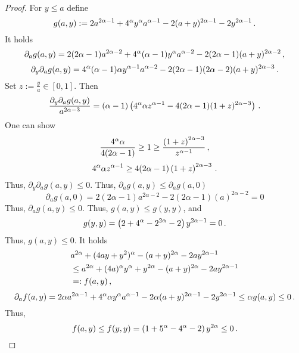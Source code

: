 \begin{proof}
	For $y\leq a$ define
	\begin{equation*}
		g(a,y) := 2a^{2\alpha-1} + 4^\alpha y^\alpha a^{\alpha-1} - 2(a+y)^{2\alpha-1} - 2y^{2\alpha-1}
		\, .
	\end{equation*}
	It holds
	\begin{equation*}
		\partial_a g(a,y) = 2(2\alpha-1)a^{2\alpha-2} + 4^\alpha(\alpha-1) y^\alpha a^{\alpha-2} - 2(2\alpha-1)(a+y)^{2\alpha-2}
		\, ,
	\end{equation*}
	\begin{equation*}
		\partial_y \partial_a g(a,y) = 4^\alpha (\alpha-1) \alpha y^{\alpha-1} a^{\alpha-2} - 2(2\alpha-1)(2\alpha-2)(a+y)^{2\alpha-3}
		\, .
	\end{equation*}
	Set $z := \frac{y}{a} \in[0,1]$. Then
	\begin{equation*}
	 \frac{\partial_y \partial_a g(a,y)}{a^{2\alpha-3}} =  (\alpha-1) \left( 4^\alpha \alpha z^{\alpha-1} - 4(2\alpha-1)(1+z)^{2\alpha-3} \right)
	 \, .
	\end{equation*}
	One can show
	\begin{equation*}
		\frac{4^\alpha \alpha}{4(2\alpha-1)} \geq 1 \geq \frac{\left( 1+z \right)^{2\alpha-3}}{z^{\alpha-1}}
		\, ,
	\end{equation*}
	\begin{equation*}
		4^\alpha \alpha z^{\alpha-1} \geq 4(2\alpha-1) \left( 1+z \right)^{2\alpha-3}
		\, .
	\end{equation*}
	Thus, $\partial_y \partial_a g(a,y) \leq 0$. Thus, $\partial_a g(a,y) \leq \partial_a g(a,0)$
	\begin{equation*}
		\partial_a  g(a,0) = 2(2\alpha-1)a^{2\alpha-2} - 2(2\alpha-1)(a)^{2\alpha-2} = 0
	\end{equation*}
	Thus, $\partial_a g(a,y) \leq 0$. Thus, $g(a,y) \leq g(y,y)$, and
	\begin{equation*}
		g(y,y) = \left( 2 + 4^\alpha - 2^{2\alpha} - 2 \right) y^{2\alpha-1} = 0
		\, .
	\end{equation*}
	Thus,  $g(a,y) \leq 0$. It holds
	\begin{align*}
		&a^{2\alpha} + (4 a y + y^2)^\alpha - (a+y)^{2\alpha} - 2 a y^{2\alpha-1}
		\\&\leq 
		a^{2\alpha} + (4 a)^\alpha y^\alpha +y^{2\alpha} - (a+y)^{2\alpha} - 2 a y^{2\alpha-1}
		\\&=:f(a,y)
		\, ,
	\end{align*}
	\begin{equation*}
		\partial_a f(a,y) = 2\alpha a^{2\alpha-1} + 4^\alpha \alpha y^\alpha a^{\alpha-1} - 2\alpha(a+y)^{2\alpha-1} - 2y^{2\alpha-1}
		\leq \alpha g(a,y) \leq 0
		\, .
	\end{equation*}
	Thus,
	\begin{equation*}
		f(a,y) \leq f(y,y) = \left( 1+5^\alpha-4^\alpha-2 \right) y^{2\alpha} \leq 0
		\, .
	\end{equation*}
\end{proof}
